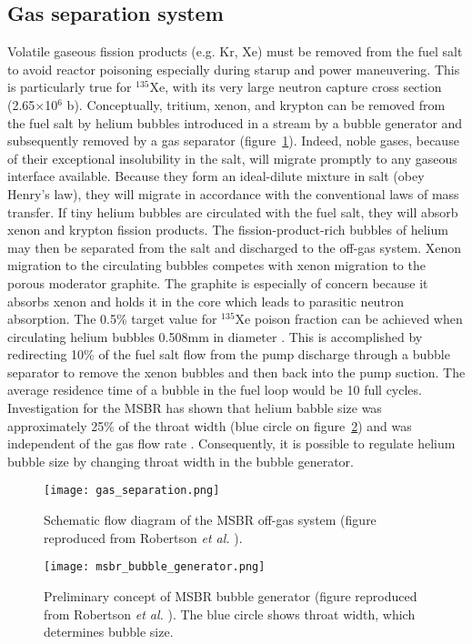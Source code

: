 \subsection{Gas separation system}
Volatile gaseous fission products (e.g. Kr, Xe) must be removed from the fuel salt 
to avoid reactor poisoning especially during starup and power maneuvering. This is 
particularly true for $^{135}$Xe, with its very large neutron capture cross 
section (2.65$\times$10$^6$ b). Conceptually, tritium, xenon, and krypton 
can be removed from the fuel salt by helium bubbles introduced in a stream 
by a bubble generator and subsequently removed 
by a gas separator (figure~\ref{fig:gas_removal_system}). Indeed, noble gases, because of their exceptional insolubility 
in the salt, will migrate promptly to any gaseous interface available. Because 
they form an ideal-dilute mixture in salt (obey Henry's law), they will migrate in 
accordance with the conventional laws of mass transfer. If tiny helium bubbles 
are circulated with the fuel salt, they will absorb xenon and krypton fission 
products. The fission-product-rich bubbles of helium may then be separated from 
the salt and discharged to the off-gas system. Xenon migration to the circulating 
bubbles competes with xenon migration to the porous moderator graphite. 
The graphite is especially of concern because it absorbs xenon and holds it in the 
core which leads to parasitic neutron absorption. The 0.5\% target value for 
$^{135}$Xe poison fraction can be achieved when circulating helium bubbles 
0.508mm in diameter \cite{robertson_conceptual_1971}. This is accomplished by 
redirecting 10\% of the fuel salt flow from the pump discharge 
through a bubble separator 
to remove the xenon bubbles and then back into the pump suction. The average 
residence time of a bubble in the fuel loop would be 10 full cycles. Investigation 
for the \gls{MSBR} has shown that helium babble size was approximately 25\% of the 
throat width (blue circle on figure~\ref{fig:bubble_separator}) and was independent 
of the gas flow rate \cite{robertson_conceptual_1971}. Consequently, it is possible 
to regulate helium bubble size by changing throat width in the bubble generator.
\begin{figure}[htp!] %
  \centering
  \texttt{[image: gas\_separation.png]}
  \caption{Schematic flow diagram of the \gls{MSBR} off-gas system (figure 
  reproduced from Robertson \emph{et al.} \cite{robertson_conceptual_1971}).}
  \label{fig:gas_removal_system}
\end{figure}
\begin{figure}[htp!] %
  \centering
  \texttt{[image: msbr\_bubble\_generator.png]}
  \caption{Preliminary concept of \gls{MSBR} bubble generator (figure 
  reproduced from Robertson \emph{et al.} \cite{robertson_conceptual_1971}). 
  The blue circle shows 
  throat width, which determines bubble size.}
  \label{fig:bubble_separator}
\end{figure}

